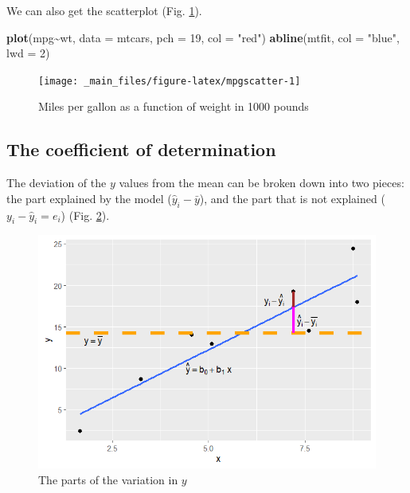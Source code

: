 \documentclass[
]{book}
\newenvironment{Shaded}{\begin{snugshade}}{\end{snugshade}}
\newcommand{\AttributeTok}[1]{\textcolor[rgb]{0.13,0.29,0.53}{#1}}
\newcommand{\DecValTok}[1]{\textcolor[rgb]{0.00,0.00,0.81}{#1}}
\newcommand{\FunctionTok}[1]{\textcolor[rgb]{0.13,0.29,0.53}{\textbf{#1}}}
\newcommand{\NormalTok}[1]{#1}
\newcommand{\SpecialCharTok}[1]{\textcolor[rgb]{0.81,0.36,0.00}{\textbf{#1}}}
\newcommand{\StringTok}[1]{\textcolor[rgb]{0.31,0.60,0.02}{#1}}
\theoremstyle{definition}
\theoremstyle{definition}
\theoremstyle{definition}
\theoremstyle{definition}
\theoremstyle{remark}
\begin{document}
We can also get the scatterplot (Fig. \ref{fig:mpgscatter}).

\begin{Shaded}
\begin{Highlighting}[]
\FunctionTok{plot}\NormalTok{(mpg}\SpecialCharTok{\textasciitilde{}}\NormalTok{wt, }\AttributeTok{data =}\NormalTok{ mtcars, }\AttributeTok{pch =} \DecValTok{19}\NormalTok{, }\AttributeTok{col =} \StringTok{"red"}\NormalTok{)}
\FunctionTok{abline}\NormalTok{(mtfit, }\AttributeTok{col =} \StringTok{"blue"}\NormalTok{, }\AttributeTok{lwd =} \DecValTok{2}\NormalTok{)}
\end{Highlighting}
\end{Shaded}

\begin{figure}

{\centering \texttt{[image: \_main\_files/figure-latex/mpgscatter-1]} 

}

\caption{Miles per gallon as a function of weight in 1000 pounds}\label{fig:mpgscatter}
\end{figure}

\subsection*{The coefficient of determination}\label{the-coefficient-of-determination}

The deviation of the \(y\) values from the mean can be broken down into two pieces: the part explained by the model (\(\hat{y}_i-\bar{y}\)), and the part that is not explained (\(y_i-\hat{y}_i=e_i\)) (Fig. \ref{fig:explained}).

\begin{figure}

{\centering \includegraphics[width=0.75\linewidth]{images/variation} 

}

\caption{The parts of the variation in $y$}\label{fig:explained}
\end{figure}
\end{document}
